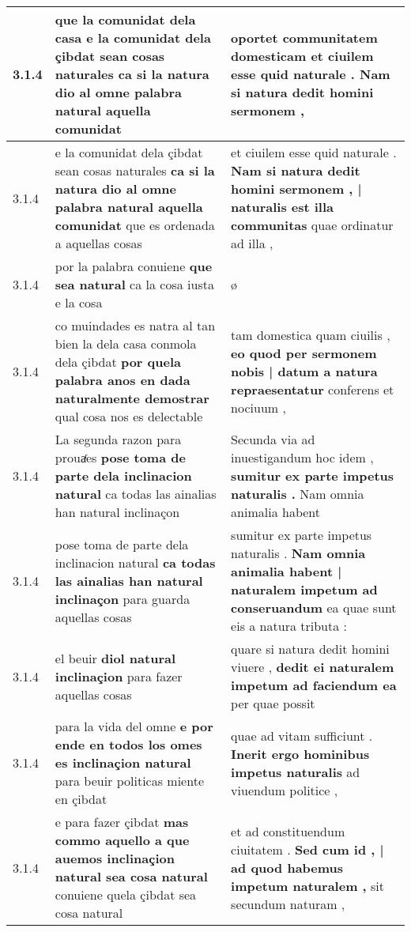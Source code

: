 \begin{tabular}{|p{1cm}|p{6.5cm}|p{6.5cm}|}
3.1.4 & que la comunidat dela casa \textbf{ e la comunidat dela çibdat sean cosas naturales } ca si la natura dio al omne palabra natural aquella comunidat & oportet communitatem domesticam \textbf{ et ciuilem esse quid naturale . } Nam si natura dedit homini sermonem , \\\hline
3.1.4 & e la comunidat dela çibdat sean cosas naturales \textbf{ ca si la natura dio al omne palabra natural aquella comunidat } que es ordenada a aquellas cosas & et ciuilem esse quid naturale . \textbf{ Nam si natura dedit homini sermonem , | naturalis est illa communitas } quae ordinatur ad illa , \\\hline
3.1.4 & por la palabra conuiene \textbf{ que sea natural } ca la cosa iusta e la cosa & ø \\\hline
3.1.4 & co muindades es natra al tan bien la dela casa conmola dela çibdat \textbf{ por quela palabra anos en dada naturalmente demostrar } qual cosa nos es delectable & tam domestica quam ciuilis , \textbf{ eo quod per sermonem nobis | datum a natura repraesentatur } conferens et nociuum , \\\hline
3.1.4 & La segunda razon para prouaͬes \textbf{ pose toma de parte dela inclinacion natural } ca todas las ainalias han natural inclinaçon & Secunda via ad inuestigandum hoc idem , \textbf{ sumitur ex parte impetus naturalis . } Nam omnia animalia habent \\\hline
3.1.4 & pose toma de parte dela inclinacion natural \textbf{ ca todas las ainalias han natural inclinaçon } para guarda aquellas cosas & sumitur ex parte impetus naturalis . \textbf{ Nam omnia animalia habent | naturalem impetum ad conseruandum } ea quae sunt eis a natura tributa : \\\hline
3.1.4 & el beuir \textbf{ diol natural inclinaçion } para fazer aquellas cosas & quare si natura dedit homini viuere , \textbf{ dedit ei naturalem impetum ad faciendum ea } per quae possit \\\hline
3.1.4 & para la vida del omne \textbf{ e por ende en todos los omes es inclinaçion natural } para beuir politicas miente en çibdat & quae ad vitam sufficiunt . \textbf{ Inerit ergo hominibus impetus naturalis } ad viuendum politice , \\\hline
3.1.4 & e para fazer çibdat \textbf{ mas commo aquello a que auemos inclinaçion natural sea cosa natural } conuiene quela çibdat sea cosa natural & et ad constituendum ciuitatem . \textbf{ Sed cum id , | ad quod habemus impetum naturalem , } sit secundum naturam , \\\hline

\end{tabular}
